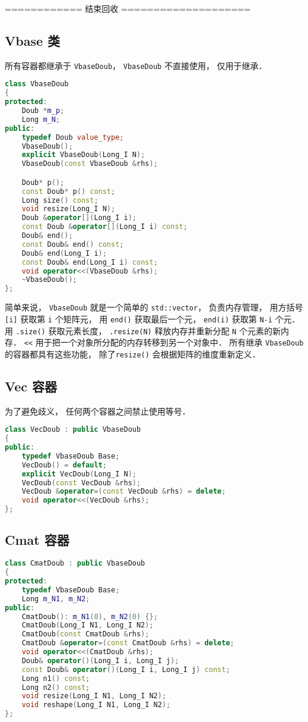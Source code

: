 ============ 结束回收 ====================

\subsection{Vbase 类}
所有容器都继承于 \verb|VbaseDoub|， \verb|VbaseDoub| 不直接使用， 仅用于继承．
\begin{lstlisting}[language=cpp]
class VbaseDoub
{
protected:
    Doub *m_p;
    Long m_N;
public:
    typedef Doub value_type;
    VbaseDoub();
    explicit VbaseDoub(Long_I N);
    VbaseDoub(const VbaseDoub &rhs);

    Doub* p();
    const Doub* p() const;
    Long size() const;
    void resize(Long_I N);
    Doub &operator[](Long_I i);
    const Doub &operator[](Long_I i) const;
    Doub& end();
    const Doub& end() const;
    Doub& end(Long_I i);
    const Doub& end(Long_I i) const;
    void operator<<(VbaseDoub &rhs);
    ~VbaseDoub();
};
\end{lstlisting}

简单来说， \verb|VbaseDoub| 就是一个简单的 \verb|std::vector|， 负责内存管理， 用方括号 \verb|[i]| 获取第 \verb|i| 个矩阵元， 用 \verb|end()| 获取最后一个元， \verb|end(i)| 获取第 \verb|N-i| 个元． 用 \verb|.size()| 获取元素长度， \verb|.resize(N)| 释放内存并重新分配 \verb|N| 个元素的新内存． \verb|<<| 用于把一个对象所分配的内存转移到另一个对象中． 所有继承 \verb|VbaseDoub| 的容器都具有这些功能， 除了\verb|resize()| 会根据矩阵的维度重新定义．

\subsection{Vec 容器}
为了避免歧义， 任何两个容器之间禁止使用等号．
\begin{lstlisting}[language=cpp]
class VecDoub : public VbaseDoub
{
public:
    typedef VbaseDoub Base;
    VecDoub() = default;
    explicit VecDoub(Long_I N);
    VecDoub(const VecDoub &rhs);
    VecDoub &operator=(const VecDoub &rhs) = delete;
    void operator<<(VecDoub &rhs);
};
\end{lstlisting}

\subsection{Cmat 容器}
\begin{lstlisting}[language=cpp]
class CmatDoub : public VbaseDoub
{
protected:
    typedef VbaseDoub Base;
    Long m_N1, m_N2;
public:
    CmatDoub(): m_N1(0), m_N2(0) {};
    CmatDoub(Long_I N1, Long_I N2);
    CmatDoub(const CmatDoub &rhs);
    CmatDoub &operator=(const CmatDoub &rhs) = delete;
    void operator<<(CmatDoub &rhs);
    Doub& operator()(Long_I i, Long_I j);
    const Doub& operator()(Long_I i, Long_I j) const;
    Long n1() const;
    Long n2() const;
    void resize(Long_I N1, Long_I N2);
    void reshape(Long_I N1, Long_I N2);
};
\end{lstlisting}

